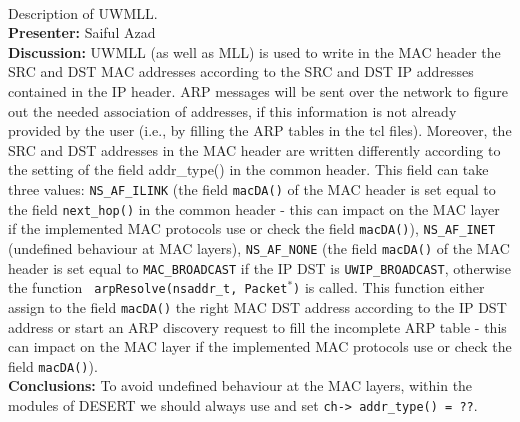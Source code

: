 \documentclass[11pt,journal,draftclsnofoot,onecolumn,twoside,letterpaper]{IEEEtran}
\theoremstyle{definition} \newtheorem{definition}[]{Definition}
\theoremstyle{theorem} \newtheorem{theorem}[]{Theorem}
\begin{document}
\  \\
  Description of UWMLL.\\
{\bf Presenter:} Saiful Azad\\
{\bf Discussion:} UWMLL (as well as MLL) is used to write in the MAC header the SRC and DST MAC addresses according to the SRC and DST IP addresses contained in the IP header. ARP messages will be sent over the network to figure out the needed association of addresses, if this information is not already provided by the user (i.e., by filling the ARP tables in the tcl files). Moreover, the SRC and DST addresses in the MAC header are written differently according to the setting of the field addr\_type() in the common header. This field can take three values: {\tt NS\_AF\_ILINK} (the field {\tt macDA()} of the MAC header is set equal to the field {\tt next\_hop()} in the common header - this can impact on the MAC layer if the implemented MAC protocols use or check the field  {\tt macDA()}), {\tt NS\_AF\_INET} (undefined behaviour at MAC layers), {\tt NS\_AF\_NONE} (the field {\tt macDA()} of the MAC header is set equal to {\tt MAC\_BROADCAST} if the IP DST is {\tt UWIP\_BROADCAST}, otherwise the function {\tt 
arpResolve(nsaddr\_t, Packet$^*$)} is called. This function either assign to the field {\tt macDA()} the right MAC DST address according to the IP DST address or start an ARP discovery request to fill the incomplete ARP table - this can impact on the MAC layer if the implemented MAC protocols use or check the field  {\tt macDA()}).\\ 
{\bf Conclusions:} 
To avoid undefined behaviour at the MAC layers, within the modules of DESERT we should always use and set {\tt ch-> addr\_type() = ??}. 
\end{document}
